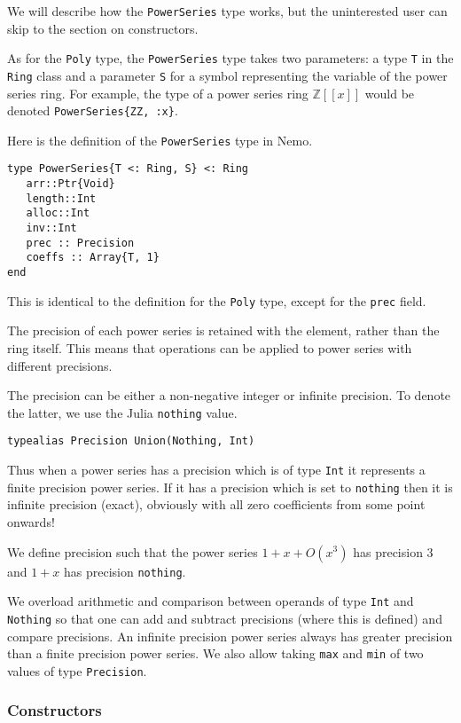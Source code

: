 \documentclass[a4paper,10pt]{article}
\newcommand{\Z}{\mathbb{Z}}
\newcommand{\code}{\lstinline}
\begin{document}
{{{We will describe how the \code{PowerSeries} type works, but the uninterested
user can skip to the section on constructors.

As for the \code{Poly} type, the \code{PowerSeries} type takes two parameters:
a type \code{T} in the \code{Ring} class and a parameter \code{S} for a symbol
representing the variable of the power series ring. For example, the type of
a power series ring $\Z[[x]]$ would be denoted \code|PowerSeries{ZZ, :x}|.

Here is the definition of the \code{PowerSeries} type in Nemo.

\begin{lstlisting}
type PowerSeries{T <: Ring, S} <: Ring
   arr::Ptr{Void}
   length::Int
   alloc::Int
   inv::Int
   prec :: Precision
   coeffs :: Array{T, 1}
end
\end{lstlisting}

This is identical to the definition for the \code{Poly} type, except for the
\code{prec} field.

The precision of each power series is retained with the element, rather than
the ring itself. This means that operations can be applied to power series
with different precisions.

The precision can be either a non-negative integer or infinite precision. To
denote the latter, we use the Julia \code{nothing} value.

\begin{lstlisting}
typealias Precision Union(Nothing, Int)
\end{lstlisting}

Thus when a power series has a precision which is of type \code{Int} it
represents a finite precision power series. If it has a precision which is
set to \code{nothing} then it is infinite precision (exact), obviously
with all zero coefficients from some point onwards!

We define precision such that the power series $1 + x + O(x^3)$ has
precision $3$ and $1 + x$ has precision \code{nothing}.

We overload arithmetic and comparison between operands of type \code{Int}
and \code{Nothing} so that one can add and subtract precisions (where this
is defined) and compare precisions. An infinite precision power series
always has greater precision than a finite precision power series. We also
allow taking \code{max} and \code{min} of two values of type \code{Precision}.

\subsubsection{Constructors}

}}}
\end{document}

